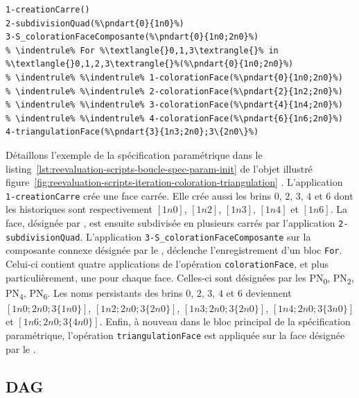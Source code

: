 \noindent
\begin{minipage}{1.0\linewidth}
\begin{lstlisting}[style=script-style,
escapechar=\%,
caption=Spécification paramétrique avec boucle,
label=lst:reevaluation-scripts-boucle-spec-param-init,
captionpos=b]
1-creationCarre()
2-subdivisionQuad(%\pndart{0}{1n0}%)
3-S_colorationFaceComposante(%\pndart{0}{1n0;2n0}%)
% \indentrule% For %\textlangle{}0,1,3\textrangle{}% in %\textlangle{}0,1,2,3\textrangle{}%(%\pndart{0}{1n0;2n0}%)
% \indentrule% %\indentrule% 1-colorationFace(%\pndart{0}{1n0;2n0}%)
% \indentrule% %\indentrule% 2-colorationFace(%\pndart{2}{1n2;2n0}%)
% \indentrule% %\indentrule% 3-colorationFace(%\pndart{4}{1n4;2n0}%)
% \indentrule% %\indentrule% 4-colorationFace(%\pndart{6}{1n6;2n0}%)
4-triangulationFace(%\pndart{3}{1n3;2n0};3\{2n0\}%)
\end{lstlisting}
\end{minipage}


Détaillons l'exemple de la spécification paramétrique dans le
listing~\ref{lst:reevaluation-scripts-boucle-spec-param-init} de l'objet illustré
figure~\ref{fig:reevaluation-scripts-iteration-coloration-triangulation} . %
L'application \texttt{1\allowbreak{}-\allowbreak{}creation\-Carre} crée une face carrée. %
Elle crée aussi les brins \(0\), \(2\), \(3\), \(4\) et \(6\) dont les
historiques sont respectivement \([1n0]\), \([1n2]\), \([1n3]\), \([1n4]\) et
\([1n6]\). %
La face, désignée par , est ensuite subdivisée en plusieurs
carrés par l'application
\texttt{2\allowbreak{}-\allowbreak{}subdivision\-Quad}. %
L'application
\texttt{3\allowbreak{}-\allowbreak{}S\allowbreak{}\_\allowbreak{}coloration\-Face\-Composante}
sur la composante conn\-exe désignée par le , déclenche l'enregistrement d'un
bloc \texttt{For}. %
Celui-ci contient quatre applications de l'opération \texttt{coloration\-Face},
et plus particulièrement, une pour chaque face. %
Celles-ci sont désignées par les PN\textsubscript{0}, PN\textsubscript{2},
PN\textsubscript{4}, PN\textsubscript{6}. %
Les noms persistants des brins \(0\), \(2\), \(3\), \(4\) et \(6\) deviennent
\([1n0;2n0;3\{1n0\}]\), \([1n2;2n0;3\{2n0\}]\), \([1n3;2n0;3\{2n0\}]\), \([1n4;2n0;3\{3n0\}]\)
et \([1n6;2n0;3\{4n0\}]\). %
Enfin, à nouveau dans le bloc principal de la spécification paramétrique,
l'opération \texttt{triangulation\-Face} est appliquée sur la face désignée par
le . %



\subsection {DAG}
\label{sec:reevaluation-scripts-iteration-extension-DAG}



